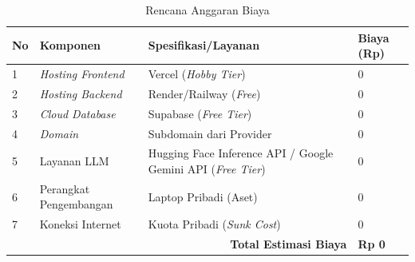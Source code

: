 \begin{table}[H]
    \centering
    \caption{Rencana Anggaran Biaya}
    \label{tbl:rab}
    \begin{tabular}{|p{}|p{}|p{}|p{}|}
        \hline
        \textbf{No} & \textbf{Komponen} & \textbf{Spesifikasi/Layanan} & \textbf{Biaya (Rp)} \\
        \hline
        1 & \textit{Hosting Frontend} & Vercel (\textit{Hobby Tier}) & 0 \\
        \hline
        2 & \textit{Hosting Backend} & Render/Railway (\textit{Free}) & 0 \\
        \hline
        3 & \textit{Cloud Database} & Supabase (\textit{Free Tier}) & 0 \\
        \hline
        4 & \textit{Domain} & Subdomain dari Provider & 0 \\
        \hline
        5 & Layanan LLM & Hugging Face Inference API / Google Gemini API (\textit{Free Tier}) & 0 \\
        \hline
        6 & Perangkat Pengembangan & Laptop Pribadi (Aset) & 0 \\
        \hline
        7 & Koneksi Internet & Kuota Pribadi (\textit{Sunk Cost}) & 0 \\
        \hline
        \multicolumn{3}{|r|}{\textbf{Total Estimasi Biaya}} & \textbf{Rp 0} \\
        \hline
    \end{tabular}
\end{table}